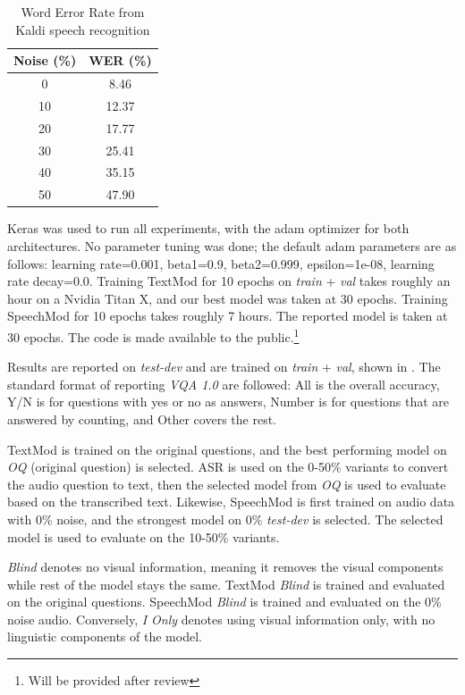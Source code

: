 \documentclass[letterpaper]{article} %
\begin{document}
\begin{table}[t]
\centering
\caption{Word Error Rate from Kaldi speech recognition}
\label{table:wer}
\begin{tabular}{c|c}
Noise (\%)   & WER (\%) \\ \hline
0  & 8.46  \\
10 & 12.37 \\
20 & 17.77 \\
30 & 25.41 \\
40 & 35.15 \\
50 & 47.90
\end{tabular}
\end{table}


Keras was used to run all experiments, with the adam optimizer for both architectures. No parameter tuning was done; the default adam parameters are as follows: learning rate=0.001, beta1=0.9, beta2=0.999, epsilon=1e-08, learning  rate decay=0.0. Training TextMod for 10 epochs on \textit{train} + \textit{val} takes roughly an hour on a Nvidia Titan X, and our best model was taken at 30 epochs. Training SpeechMod for 10 epochs takes roughly 7 hours. The reported model is taken at 30 epochs. The code is made available to the public.\footnote{Will be provided after review}

Results are reported on \textit{test-dev} and are trained on \textit{train} + \textit{val}, shown in . The standard format of reporting \textit{VQA 1.0} are followed: All is the overall accuracy, Y/N is for questions with yes or no as answers, Number is for questions that are answered by counting, and Other covers the rest.

TextMod is trained on the original questions, and the best performing model on \textit{OQ} (original question) is selected. ASR is used on the 0-50\% variants to convert the audio question to text, then the selected model from \textit{OQ} is used to evaluate based on the transcribed text. Likewise, SpeechMod is first trained on audio data with 0\% noise, and the strongest model on 0\% \textit{test-dev} is selected. The selected model is used to evaluate on the 10-50\% variants.

\textit{Blind} denotes no visual information, meaning it removes the visual components while rest of the model stays the same. TextMod \textit{Blind} is trained and evaluated on the original questions. SpeechMod \textit{Blind} is trained and evaluated on the 0\% noise audio. Conversely, \textit{I Only} denotes using visual information only, with no linguistic components of the model.
\end{document}
